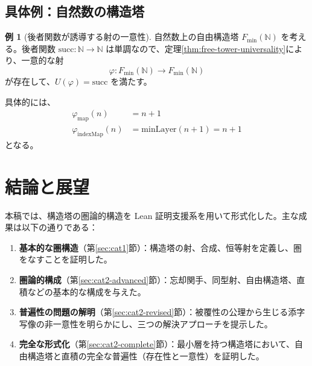 \documentclass[a4paper,12pt]{ltjsarticle}
\theoremstyle{definition}
\newtheorem{example}[definition]{例}
\begin{document}
\subsection{具体例：自然数の構造塔}

\begin{example}[後者関数が誘導する射の一意性]
自然数上の自由構造塔 $F_{\min}(\mathbb{N})$ を考える。後者関数 $\mathrm{succ}: \mathbb{N} \to \mathbb{N}$ は単調なので、定理\ref{thm:free-tower-universality}により、一意的な射
\[
\varphi: F_{\min}(\mathbb{N}) \to F_{\min}(\mathbb{N})
\]
が存在して、$U(\varphi) = \mathrm{succ}$ を満たす。

具体的には、
\begin{align*}
\varphi_{\text{map}}(n) &= n + 1 \\
\varphi_{\text{indexMap}}(n) &= \mathrm{minLayer}(n+1) = n + 1
\end{align*}
となる。
\end{example}

\section{結論と展望}

本稿では、構造塔の圏論的構造を Lean 証明支援系を用いて形式化した。主な成果は以下の通りである：

\begin{enumerate}
\item \textbf{基本的な圏構造}（第\ref{sec:cat1}節）：構造塔の射、合成、恒等射を定義し、圏をなすことを証明した。

\item \textbf{圏論的構成}（第\ref{sec:cat2-advanced}節）：忘却関手、同型射、自由構造塔、直積などの基本的な構成を与えた。

\item \textbf{普遍性の問題の解明}（第\ref{sec:cat2-revised}節）：被覆性の公理から生じる添字写像の非一意性を明らかにし、三つの解決アプローチを提示した。

\item \textbf{完全な形式化}（第\ref{sec:cat2-complete}節）：最小層を持つ構造塔において、自由構造塔と直積の完全な普遍性（存在性と一意性）を証明した。
\end{enumerate}
\end{document}
